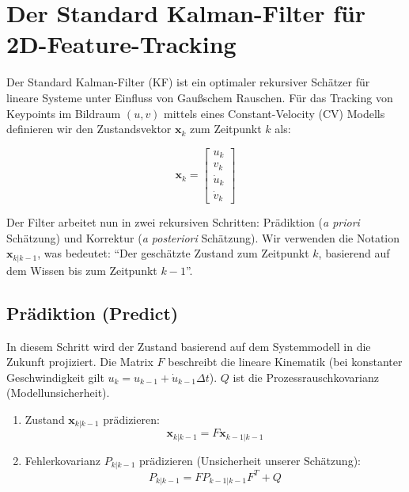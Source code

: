 \documentclass{article}
\begin{document}
\section{Der Standard Kalman-Filter für 2D-Feature-Tracking}
\label{sec:standard_kf}

Der Standard Kalman-Filter (KF) ist ein optimaler rekursiver Schätzer für lineare Systeme unter Einfluss von Gaußschem Rauschen. Für das Tracking von Keypoints im Bildraum $(u, v)$ mittels eines Constant-Velocity (CV) Modells definieren wir den Zustandsvektor $\mathbf{x}_k$ zum Zeitpunkt $k$ als:

\begin{equation}
    \mathbf{x}_k = \begin{bmatrix} u_k \\ v_k \\ \dot{u}_k \\ \dot{v}_k \end{bmatrix}
\end{equation}

Der Filter arbeitet nun in zwei rekursiven Schritten: Prädiktion (\textit{a priori} Schätzung) und Korrektur (\textit{a posteriori} Schätzung). Wir verwenden die Notation $\mathbf{x}_{k|k-1}$, was bedeutet: \enquote{Der geschätzte Zustand zum Zeitpunkt $k$, basierend auf dem Wissen bis zum Zeitpunkt $k-1$}.




\subsection{Prädiktion (Predict)}
In diesem Schritt wird der Zustand basierend auf dem Systemmodell in die Zukunft projiziert. Die Matrix $F$ beschreibt die lineare Kinematik (bei konstanter Geschwindigkeit gilt $u_k=u_{k-1}+\dot{u}_{k-1}\Delta t$). $Q$ ist die Prozessrauschkovarianz (Modellunsicherheit).

\begin{enumerate}
    \item Zustand $\mathbf{x}_{k|k-1}$ prädizieren:
        \begin{equation}
            \mathbf{x}_{k|k-1} = F \mathbf{x}_{k-1|k-1}
        \end{equation}
    \item Fehlerkovarianz $P_{k|k-1}$ prädizieren (Unsicherheit unserer Schätzung):
        \begin{equation}
            P_{k|k-1} = F P_{k-1|k-1} F^T + Q
        \end{equation}
\end{enumerate}
\end{document}
